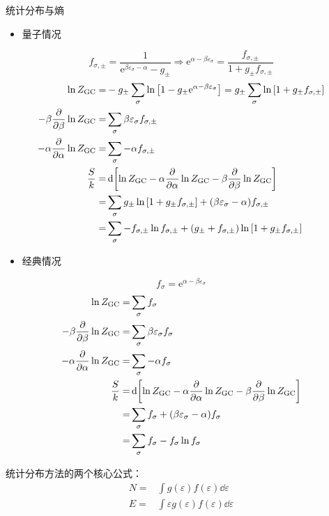 \begin{framed}
统计分布与熵
\begin{itemize}
    \item 量子情况
\end{itemize} \[
f_{\sigma, \pm} = \frac{1}{\mathrm{e}^{\beta \varepsilon_{\sigma} - \alpha} - g_{\pm} } \Rightarrow \mathrm{e}^{\alpha - \beta \varepsilon_{\sigma}} = \frac{f_{\sigma, \pm}}{1 + g_{\pm} f_{\sigma, \pm}}
\] \begin{align*}
    \ln{Z_{\text{GC}}} = & - g_{\pm} \sum_{\sigma} \ln \qty[1 - g_{\pm} \mathrm{e}^{\alpha - \beta \varepsilon_{\sigma}}] = g_{\pm} \sum_{\sigma} \ln \qty[1 + g_{\pm} f_{\sigma, \pm}]\\
    - \beta \pdv{\beta} \ln{Z_{\text{GC}}} = & \sum_{\sigma} \beta \varepsilon_{\sigma} f_{\sigma, \pm}\\
    - \alpha \pdv{\alpha} \ln{Z_{\text{GC}}} = & \sum_{\sigma} - \alpha f_{\sigma, \pm}\\
    \frac{S}{k} = & \dd{\qty[\ln{Z_{\text{GC}}} - \alpha \pdv{\alpha} \ln{Z_{\text{GC}}} - \beta \pdv{\beta} \ln{Z_{\text{GC}}}]}\\
    = & \sum_{\sigma} g_{\pm} \ln \qty[1 + g_{\pm} f_{\sigma, \pm}] + (\beta \varepsilon_{\sigma} - \alpha) f_{\sigma, \pm}\\
    = & \sum_{\sigma} - f_{\sigma, \pm} \ln{f_{\sigma, \pm}} + \qty(g_{\pm} + f_{\sigma, \pm}) \ln \qty[ 1 + g_{\pm} f_{\sigma, \pm} ]
\end{align*}
\begin{itemize}
    \item 经典情况
\end{itemize} \[
f_{\sigma} = \mathrm{e}^{\alpha - \beta \varepsilon_{\sigma}}
\] \begin{align*}
    \ln{Z_{\text{GC}}} = & \sum_{\sigma} f_{\sigma}\\
    - \beta \pdv{\beta} \ln{Z_{\text{GC}}} = & \sum_{\sigma} \beta \varepsilon_{\sigma} f_{\sigma}\\
    - \alpha \pdv{\alpha} \ln{Z_{\text{GC}}} = & \sum_{\sigma} - \alpha f_{\sigma}\\
    \frac{S}{k} = & \dd{\qty[\ln{Z_{\text{GC}}} - \alpha \pdv{\alpha} \ln{Z_{\text{GC}}} - \beta \pdv{\beta} \ln{Z_{\text{GC}}}]}\\
    = & \sum_{\sigma} f_{\sigma} + (\beta \varepsilon_{\sigma} - \alpha) f_{\sigma}\\
    = & \sum_{\sigma} f_{\sigma} - f_{\sigma} \ln{f_{\sigma}}
\end{align*}
\end{framed}
统计分布方法的两个核心公式：
\begin{align*}
    N = & \int g(\varepsilon) f(\varepsilon) \dd{\varepsilon}\\
    E = & \int \varepsilon g(\varepsilon) f(\varepsilon) \dd{\varepsilon}
\end{align*}

